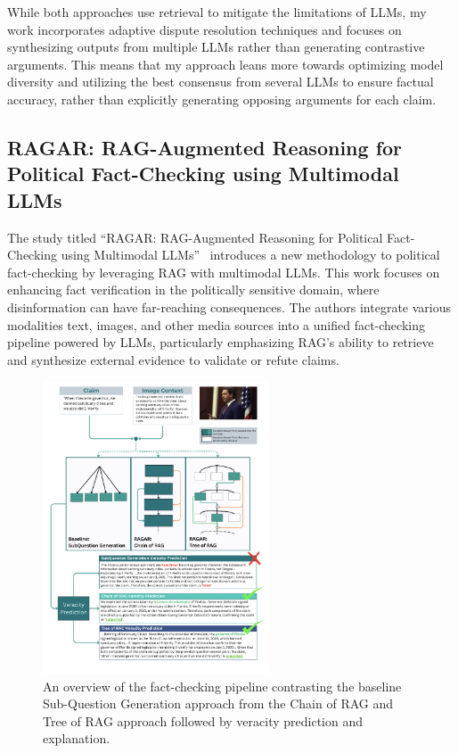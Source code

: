 While both approaches use retrieval to mitigate the limitations of LLMs, my work incorporates adaptive dispute resolution techniques and focuses on synthesizing outputs from multiple LLMs rather than generating contrastive arguments.
This means that my approach leans more towards optimizing model diversity and utilizing the best consensus from several LLMs to ensure factual accuracy, rather than explicitly generating opposing arguments for each claim.

\subsection{RAGAR: RAG-Augmented Reasoning for Political Fact-Checking using Multimodal LLMs}\label{sec:agar-rag-augmented-reasoning}
The study titled ``RAGAR: RAG-Augmented Reasoning for Political Fact-Checking using Multimodal LLMs''~\cite{khaliq2024ragarfalsehoodradarragaugmented} introduces a new methodology to political fact-checking by leveraging RAG with multimodal LLMs.
This work focuses on enhancing fact verification in the politically sensitive domain, where disinformation can have far-reaching consequences.
The authors integrate various modalities text, images, and other media sources into a unified fact-checking pipeline powered by LLMs, particularly emphasizing RAG’s ability to retrieve and synthesize external evidence to validate or refute claims.

\begin{figure}[ht!]
    \centering
    \begin{minipage}[b]{\textwidth}
        \centering
        \includegraphics[width=0.6\textwidth]{res/rel-ragar}
    \end{minipage}
    \caption{An overview of the fact-checking pipeline contrasting the baseline Sub-Question Generation approach from the Chain of RAG and Tree of RAG approach followed by veracity prediction and explanation.}
    \label{fig:rel-ragar}
\end{figure}

